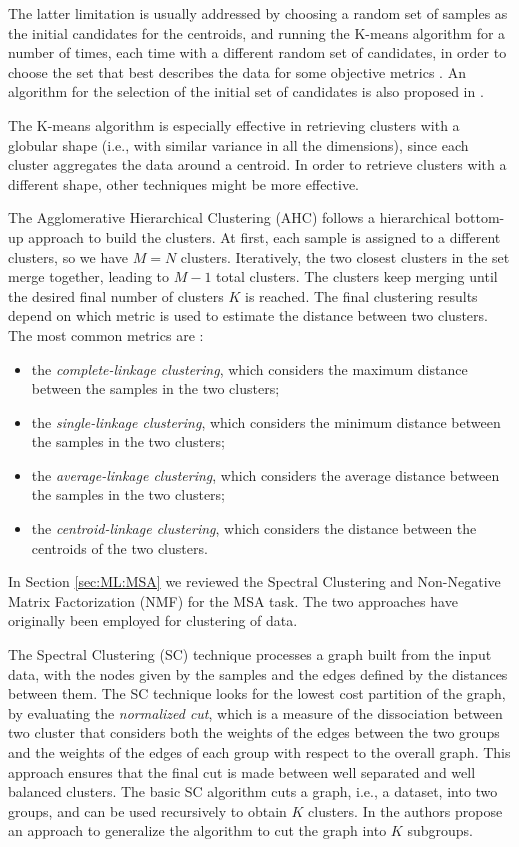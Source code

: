 The latter limitation is usually addressed by choosing a random set of samples as the initial candidates for the centroids, and running the K-means algorithm for a number of times, each time with a different random set of candidates, in order to choose the set that best describes the data for some objective metrics \cite{PAMI}. An algorithm for the selection of the initial set of candidates is also proposed in \cite{Arthur2007}.

The K-means algorithm is especially effective in retrieving clusters with a globular shape \cite{PAMI} (i.e., with similar variance in all the dimensions), since each cluster aggregates the data around a centroid. In order to retrieve clusters with a different shape, other techniques might be more effective. 

The Agglomerative Hierarchical Clustering \cite{sibson1973slink} (AHC) follows a hierarchical bottom-up approach to build the clusters. At first, each sample is assigned to a different clusters, so we have $M=N$ clusters. Iteratively, the two closest clusters in the set merge together, leading to $M-1$ total clusters. The clusters keep merging until the desired final number of clusters $K$ is reached. %
The final clustering results depend on which metric is used to estimate the distance between two clusters. The most common metrics are \cite{Tan2005}:
\begin{itemize}
	\item the \textit{complete-linkage clustering}, which considers the maximum distance between the samples in the two clusters; 
	\item the \textit{single-linkage clustering}, which considers the minimum distance between the samples in the two clusters; 
	\item the \textit{average-linkage clustering}, which considers the average distance between the samples in the two clusters; 
	\item the \textit{centroid-linkage clustering}, which considers the distance between the centroids of the two clusters.
\end{itemize}

In Section \ref{sec:ML:MSA} we reviewed the Spectral Clustering and Non-Negative Matrix Factorization (NMF) for the MSA task. The two approaches have originally been employed for clustering of data. 

The Spectral Clustering \cite{shi2000normalized} (SC) technique processes a graph built from the input data, with the nodes given by the samples and the edges defined by the distances between them. The SC technique looks for the lowest cost partition of the graph, by evaluating  the \textit{normalized cut}, which is a measure of the dissociation between two cluster that considers both the weights of the edges between the two groups and the weights of the edges of each group with respect to the overall graph. This approach ensures that the final cut is made between well separated and well balanced clusters. The basic SC algorithm cuts a graph, i.e., a dataset, into two groups, and can be used recursively to obtain $K$ clusters. In \cite{shi2000normalized} the authors propose an approach to generalize the algorithm to cut the graph into $K$ subgroups.

